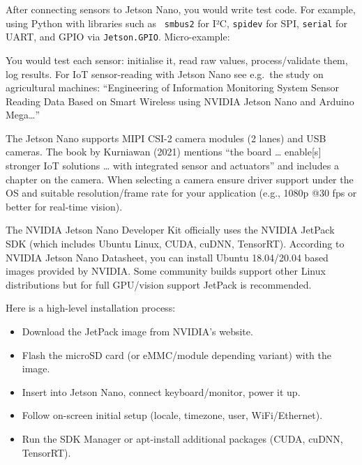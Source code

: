 {
After connecting sensors to Jetson Nano, you would write test code. For example, using Python with libraries such as 
\texttt{smbus2} for I²C, \texttt{spidev} for SPI, \texttt{serial} for UART, and GPIO via \texttt{Jetson.GPIO}. Micro-example:  
	


You would test each sensor: initialise it, read raw values, process/validate them, log results. For IoT sensor-reading with Jetson Nano see e.g.\ the study on agricultural machines: “Engineering of Information Monitoring System Sensor Reading Data Based on Smart Wireless using NVIDIA Jetson Nano and Arduino Mega…” 
}

{
The Jetson Nano supports MIPI CSI-2 camera modules (2 lanes) and USB cameras. The book by Kurniawan (2021) mentions “the board … enable[s] stronger IoT solutions … with integrated sensor and actuators” and includes a chapter on the camera.  When selecting a camera ensure driver support under the OS and suitable resolution/frame rate for your application (e.g., 1080p @30 fps or better for real-time vision).  
}

{
The NVIDIA Jetson Nano Developer Kit officially uses the NVIDIA JetPack SDK (which includes Ubuntu Linux, CUDA, cuDNN, TensorRT). 
According to NVIDIA Jetson Nano Datasheet, you can install Ubuntu 18.04/20.04 based images provided by NVIDIA. Some community builds support other Linux distributions but for full GPU/vision support JetPack is recommended.
}

{
Here is a high-level installation process:  
\begin{itemize}
\item Download the JetPack image from NVIDIA’s website.
\item Flash the microSD card (or eMMC/module depending variant) with the image.
\item Insert into Jetson Nano, connect keyboard/monitor, power it up.
\item Follow on-screen initial setup (locale, timezone, user, WiFi/Ethernet).
\item Run the SDK Manager or apt-install additional packages (CUDA, cuDNN, TensorRT).
\end{itemize}
}

